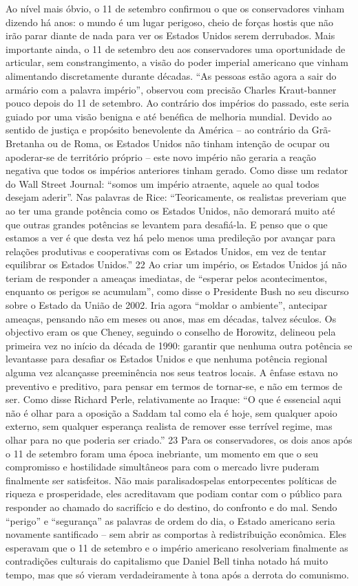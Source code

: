 Ao nível mais óbvio, o 11 de setembro confirmou o que os conservadores vinham dizendo há anos: o mundo é um lugar perigoso, cheio de forças hostis que não irão parar diante de nada para ver os Estados Unidos serem derrubados. Mais importante ainda, o 11 de setembro deu aos conservadores uma oportunidade de articular, sem constrangimento, a visão do poder imperial americano que vinham alimentando discretamente durante décadas. “As pessoas estão agora a sair do armário com a palavra império”, observou com precisão Charles Kraut-banner pouco depois do 11 de setembro. Ao contrário dos impérios do passado, este seria guiado por uma visão benigna e até benéfica de melhoria mundial. Devido ao sentido de justiça e propósito benevolente da América – ao contrário da Grã-Bretanha ou de Roma, os Estados Unidos não tinham intenção de ocupar ou apoderar-se de território próprio – este novo império não geraria a reação negativa que todos os impérios anteriores tinham gerado. Como disse um redator do Wall Street Journal: “somos um império atraente, aquele ao qual todos desejam aderir”. Nas palavras de Rice: “Teoricamente, os realistas preveriam que ao ter uma grande potência como os Estados Unidos, não demorará muito até que outras grandes potências se levantem para desafiá-la. E penso que o que estamos a ver é que desta vez há pelo menos uma predileção por avançar para relações produtivas e cooperativas com os Estados Unidos, em vez de tentar equilibrar os Estados Unidos.”
 {\color{blue} 22}  
Ao criar um império, os Estados Unidos já não teriam de responder a ameaças imediatas, de “esperar pelos acontecimentos, enquanto os perigos se acumulam”, como disse o Presidente Bush no seu discurso sobre o Estado da União de 2002. Iria agora “moldar o ambiente”, antecipar ameaças, pensando não em meses ou anos, mas em décadas, talvez séculos. Os objectivo eram os que Cheney, seguindo o conselho de Horowitz, delineou pela primeira vez no início da década de 1990: garantir que nenhuma outra potência se levantasse para desafiar os Estados Unidos e que nenhuma potência regional alguma vez alcançasse preeminência nos seus teatros locais. A ênfase estava no preventivo e preditivo, para pensar em termos de tornar-se, e não em termos de ser. Como disse Richard Perle, relativamente ao Iraque: “O que é essencial aqui não é olhar para a oposição a Saddam tal como ela é hoje, sem qualquer apoio externo, sem qualquer esperança realista de remover esse terrível regime, mas olhar para no que poderia ser criado.”
 {\color{blue} 23}  
Para os conservadores, os dois anos após o 11 de setembro foram uma época inebriante, um momento em que o seu compromisso e hostilidade simultâneos para com o mercado livre puderam finalmente ser satisfeitos. Não mais paralisados ​​pelas entorpecentes políticas de riqueza e prosperidade, eles acreditavam que podiam contar com o público para responder ao chamado do sacrifício e do destino, do confronto e do mal. Sendo “perigo” e “segurança” as palavras de ordem do dia, o Estado americano seria novamente santificado – sem abrir as comportas à redistribuição econômica. Eles esperavam que o 11 de setembro e o império americano resolveriam finalmente as contradições culturais do capitalismo que Daniel Bell tinha notado há muito tempo, mas que só vieram verdadeiramente à tona após a derrota do comunismo.
 
